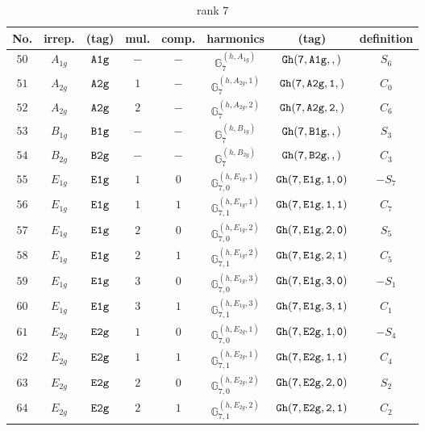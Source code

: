 \documentclass[fleqn,8pt]{jsarticle}
\begin{document}
\begin{table}[ht!]
\begin{center}
\caption{rank 7}
\renewcommand{\arraystretch}{1.3}
\begin{tabular}{cccccccc} \hline \hline
No. & irrep. & (tag) & mul. & comp. & harmonics & (tag) & definition \\ \hline
$ 50 $ & $ A_{1g} $ & $ {\tt A1g} $ & $ - $ & $ - $ & $ \mathbb{G}_{7}^{(h,A_{1g})} $ & $ {\tt Gh(7,A1g,,)} $ & $ S_{6} $ \\
$ 51 $ & $ A_{2g} $ & $ {\tt A2g} $ & $ 1 $ & $ - $ & $ \mathbb{G}_{7}^{(h,A_{2g},1)} $ & $ {\tt Gh(7,A2g,1,)} $ & $ C_{0} $ \\
$ 52 $ & $ A_{2g} $ & $ {\tt A2g} $ & $ 2 $ & $ - $ & $ \mathbb{G}_{7}^{(h,A_{2g},2)} $ & $ {\tt Gh(7,A2g,2,)} $ & $ C_{6} $ \\
$ 53 $ & $ B_{1g} $ & $ {\tt B1g} $ & $ - $ & $ - $ & $ \mathbb{G}_{7}^{(h,B_{1g})} $ & $ {\tt Gh(7,B1g,,)} $ & $ S_{3} $ \\
$ 54 $ & $ B_{2g} $ & $ {\tt B2g} $ & $ - $ & $ - $ & $ \mathbb{G}_{7}^{(h,B_{2g})} $ & $ {\tt Gh(7,B2g,,)} $ & $ C_{3} $ \\
$ 55 $ & $ E_{1g} $ & $ {\tt E1g} $ & $ 1 $ & $ 0 $ & $ \mathbb{G}_{7,0}^{(h,E_{1g},1)} $ & $ {\tt Gh(7,E1g,1,0)} $ & $ - S_{7} $ \\
$ 56 $ & $ E_{1g} $ & $ {\tt E1g} $ & $ 1 $ & $ 1 $ & $ \mathbb{G}_{7,1}^{(h,E_{1g},1)} $ & $ {\tt Gh(7,E1g,1,1)} $ & $ C_{7} $ \\
$ 57 $ & $ E_{1g} $ & $ {\tt E1g} $ & $ 2 $ & $ 0 $ & $ \mathbb{G}_{7,0}^{(h,E_{1g},2)} $ & $ {\tt Gh(7,E1g,2,0)} $ & $ S_{5} $ \\
$ 58 $ & $ E_{1g} $ & $ {\tt E1g} $ & $ 2 $ & $ 1 $ & $ \mathbb{G}_{7,1}^{(h,E_{1g},2)} $ & $ {\tt Gh(7,E1g,2,1)} $ & $ C_{5} $ \\
$ 59 $ & $ E_{1g} $ & $ {\tt E1g} $ & $ 3 $ & $ 0 $ & $ \mathbb{G}_{7,0}^{(h,E_{1g},3)} $ & $ {\tt Gh(7,E1g,3,0)} $ & $ - S_{1} $ \\
$ 60 $ & $ E_{1g} $ & $ {\tt E1g} $ & $ 3 $ & $ 1 $ & $ \mathbb{G}_{7,1}^{(h,E_{1g},3)} $ & $ {\tt Gh(7,E1g,3,1)} $ & $ C_{1} $ \\
$ 61 $ & $ E_{2g} $ & $ {\tt E2g} $ & $ 1 $ & $ 0 $ & $ \mathbb{G}_{7,0}^{(h,E_{2g},1)} $ & $ {\tt Gh(7,E2g,1,0)} $ & $ - S_{4} $ \\
$ 62 $ & $ E_{2g} $ & $ {\tt E2g} $ & $ 1 $ & $ 1 $ & $ \mathbb{G}_{7,1}^{(h,E_{2g},1)} $ & $ {\tt Gh(7,E2g,1,1)} $ & $ C_{4} $ \\
$ 63 $ & $ E_{2g} $ & $ {\tt E2g} $ & $ 2 $ & $ 0 $ & $ \mathbb{G}_{7,0}^{(h,E_{2g},2)} $ & $ {\tt Gh(7,E2g,2,0)} $ & $ S_{2} $ \\
$ 64 $ & $ E_{2g} $ & $ {\tt E2g} $ & $ 2 $ & $ 1 $ & $ \mathbb{G}_{7,1}^{(h,E_{2g},2)} $ & $ {\tt Gh(7,E2g,2,1)} $ & $ C_{2} $ \\
 \hline \hline
\end{tabular}
\end{center}
\end{table}
\end{document}
